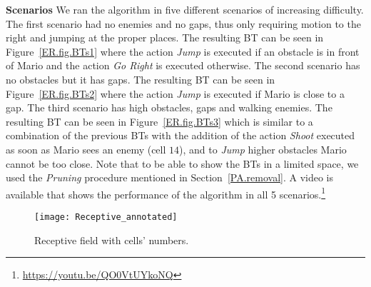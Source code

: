 \textbf{Scenarios}
We ran the algorithm in five different scenarios of increasing difficulty. {The first scenario had no enemies and no gaps, thus only requiring motion to the right and jumping at the proper places. The resulting BT can be seen in Figure~\ref{ER.fig.BTs1} where the action \emph{Jump} is executed if an obstacle is in front of Mario and the action \emph{Go Right} is executed otherwise. The second scenario has no obstacles but it has gaps. The resulting BT can be seen in Figure~\ref{ER.fig.BTs2}  where the action \emph{Jump} is executed if Mario is close to a gap. The third scenario has high obstacles, gaps and walking enemies. The resulting BT can be seen in Figure~\ref{ER.fig.BTs3} which is similar to a combination of the previous BTs with the addition of the action \emph{Shoot} executed as soon as Mario sees an enemy (cell $14$), and to \emph{Jump} higher obstacles Mario cannot be too close. Note that to be able to show the BTs in a limited space, we used the \emph{Pruning} procedure mentioned in Section~\ref{PA.removal}}.
A video is available that shows the performance of the algorithm in all 5 scenarios.\footnote {\url{https://youtu.be/QO0VtUYkoNQ}}

\begin{figure}[h]
\centering
\texttt{[image: Receptive\_annotated]}
\caption{Receptive field with cells' numbers.}
\label{ER.fig.receptiveannotated}
\end{figure}

